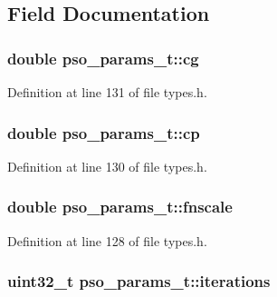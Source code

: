 \subsection{Field Documentation}
\hypertarget{structpso__params__t_a131eaad94b334972d795146b0005865a}{
\subsubsection[{cg}]{\setlength{\rightskip}{0pt plus 5cm}double pso\-\_\-params\-\_\-t\-::cg}}\label{structpso__params__t_a131eaad94b334972d795146b0005865a}


Definition at line 131 of file types.\-h.

\hypertarget{structpso__params__t_af061551bf622b55963c8dc0075342679}{
\subsubsection[{cp}]{\setlength{\rightskip}{0pt plus 5cm}double pso\-\_\-params\-\_\-t\-::cp}}\label{structpso__params__t_af061551bf622b55963c8dc0075342679}


Definition at line 130 of file types.\-h.

\hypertarget{structpso__params__t_a05eeec103899c3c07ab909c95145c5b1}{
\subsubsection[{fnscale}]{\setlength{\rightskip}{0pt plus 5cm}double pso\-\_\-params\-\_\-t\-::fnscale}}\label{structpso__params__t_a05eeec103899c3c07ab909c95145c5b1}


Definition at line 128 of file types.\-h.

\hypertarget{structpso__params__t_a09d2f0309c3f2dc43846a0f8661bf670}{
\subsubsection[{iterations}]{\setlength{\rightskip}{0pt plus 5cm}uint32\-\_\-t pso\-\_\-params\-\_\-t\-::iterations}}\label{structpso__params__t_a09d2f0309c3f2dc43846a0f8661bf670}


